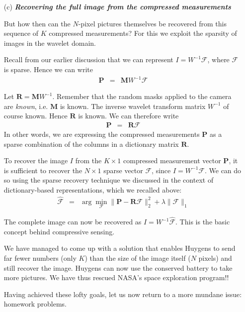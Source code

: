 \begin{enumerate}
\item[(c)] \textit{\textbf{Recovering the full image from the compressed measurements}}

But how then can the $N$-pixel pictures themselves be recovered from this sequence of $K$ compressed measurements?  For this we exploit the sparsity of images in the wavelet domain.  

Recall from our earlier discussion that we can represent $I = W^{-1} \mathcal{F}$, where $\mathcal{F}$ is sparse. Hence we can write
\begin{eqnarray}
\mathbf{P} & = & \mathbf{M}W^{-1}\mathcal{F}
\end{eqnarray}

Let $\mathbf{R} = \mathbf{M}W^{-1}$.  Remember that the random masks applied to the camera are \textit{known}, i.e. $\mathbf{M}$ is known. The inverse wavelet transform matrix $W^{-1}$ of course known.  Hence $\mathbf{R}$ is known. We can therefore write
\begin{eqnarray}
\mathbf{P} & = & \mathbf{R}\mathcal{F}
\end{eqnarray}
In other words, we are expressing the compressed measurements $\mathbf{P}$ as a sparse combination of the columns in a dictionary matrix $\mathbf{R}$.

To recover the image $I$ from the $K \times 1$ compressed measurement vector $\mathbf{P}$, it is sufficient to recover the $N \times 1$ sparse vector $\mathcal{F}$, since $I = W^{-1}\mathcal{F}$. We can do so using the sparse recovery technique we discussed in the context of dictionary-based representations, which we recalled above:
\begin{eqnarray}
\hat{\mathcal{F}} & = & \arg\min_{\mathcal{F}} \|\mathbf{P} - \mathbf{R}\mathcal{F}\|_2^2 + \lambda \|\mathcal{F}\|_1
\end{eqnarray}

The complete image can now be recovered as $I = W^{-1}\hat{\mathcal{F}}$. This is the basic concept behind compressive sensing.

We have managed to come up with a solution that enables Huygens to send far fewer numbers (only $K$) than the size of the image itself ($N$ pixels) and still recover the image. Huygens can now use the conserved battery to take more pictures.  We have thus rescued NASA's space exploration program!!

Having achieved these lofty goals, let us now return to a more mundane issue: homework problems.
\end{enumerate}


